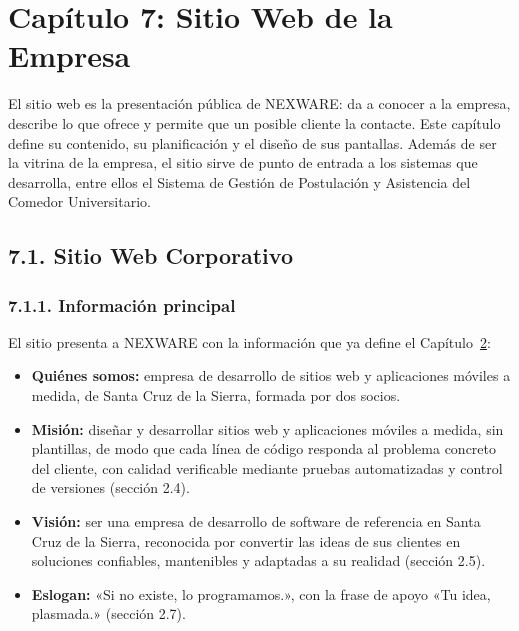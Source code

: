 
\newpage
\section{Capítulo 7: Sitio Web de la Empresa}\label{cap:sitio_web}


El sitio web es la presentación pública de NEXWARE: da a conocer a la empresa, describe lo que ofrece y permite que un posible cliente la contacte. Este capítulo define su contenido, su planificación y el diseño de sus pantallas. Además de ser la vitrina de la empresa, el sitio sirve de punto de entrada a los sistemas que desarrolla, entre ellos el Sistema de Gestión de Postulación y Asistencia del Comedor Universitario.

\subsection{7.1. Sitio Web Corporativo}

\subsubsection{7.1.1. Información principal}

El sitio presenta a NEXWARE con la información que ya define el Capítulo~\hyperref[cap:sqap]{2}:

\begin{itemize}
    \item \textbf{Quiénes somos:} empresa de desarrollo de sitios web y aplicaciones móviles a medida, de Santa Cruz de la Sierra, formada por dos socios.
    \item \textbf{Misión:} diseñar y desarrollar sitios web y aplicaciones móviles a medida, sin plantillas, de modo que cada línea de código responda al problema concreto del cliente, con calidad verificable mediante pruebas automatizadas y control de versiones (sección 2.4).
    \item \textbf{Visión:} ser una empresa de desarrollo de software de referencia en Santa Cruz de la Sierra, reconocida por convertir las ideas de sus clientes en soluciones confiables, mantenibles y adaptadas a su realidad (sección 2.5).
    \item \textbf{Eslogan:} «Si no existe, lo programamos.», con la frase de apoyo «Tu idea, plasmada.» (sección 2.7).
\end{itemize}

